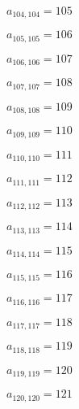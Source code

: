 \documentclass[a4paper,12pt]{article}
\begin{document}
$a _{ 104, 104 } = 105$

$a _{ 105, 105 } = 106$

$a _{ 106, 106 } = 107$

$a _{ 107, 107 } = 108$

$a _{ 108, 108 } = 109$

$a _{ 109, 109 } = 110$

$a _{ 110, 110 } = 111$

$a _{ 111, 111 } = 112$

$a _{ 112, 112 } = 113$

$a _{ 113, 113 } = 114$

$a _{ 114, 114 } = 115$

$a _{ 115, 115 } = 116$

$a _{ 116, 116 } = 117$

$a _{ 117, 117 } = 118$

$a _{ 118, 118 } = 119$

$a _{ 119, 119 } = 120$

$a _{ 120, 120 } = 121$
\end{document}
